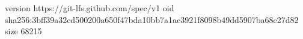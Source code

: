 version https://git-lfs.github.com/spec/v1
oid sha256:3bff39a32cd500200a650f47bda10bb7a1ac3921f8098b49dd5907ba68e27d82
size 68215
